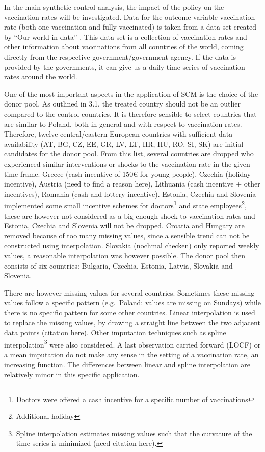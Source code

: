 \documentclass{scrbook}
\begin{document}
In the main synthetic control analysis, the impact of the policy on the
vaccination rates will be investigated. Data for the outcome variable
vaccination rate (both one vaccination and fully vaccinated) is taken
from a data set created by ``Our world in data''
\parencite{mathieu_global_2021}. This data set is a collection of
vaccination rates and other information about vaccinations from all
countries of the world, coming directly from the respective
government/government agency. If the data is provided by the
governments, it can give us a daily time-series of vaccination rates
around the world.

One of the most important aspects in the application of SCM is the
choice of the donor pool. As outlined in 3.1, the treated country should
not be an outlier compared to the control countries. It is therefore
sensible to select countries that are similar to Poland, both in general
and with respect to vaccination rates. Therefore, twelve central/eastern
European countries with sufficient data availability (AT, BG, CZ, EE,
GR, LV, LT, HR, HU, RO, SI, SK) are initial candidates for the donor
pool. From this list, several countries are dropped who experienced
similar interventions or shocks to the vaccination rate in the given
time frame. Greece (cash incentive of 150€ for young people), Czechia
(holiday incentive), Austria (need to find a reason here), Lithuania
(cash incentive + other incentives), Romania (cash and lottery
incentive). Estonia, Czechia and Slovenia implemented some small
incentive schemes for
doctors\footnote{Doctors were offered a cash incentive for a specific number of vaccinations}
and state employees\footnote{Additional holiday}, these are however not
considered as a big enough shock to vaccination rates and Estonia,
Czechia and Slovenia will not be dropped. Croatia and Hungary are
removed because of too many missing values, since a sensible trend can
not be constructed using interpolation. Slovakia (nochmal checken) only
reported weekly values, a reasonable interpolation was however possible.
The donor pool then consists of six countries: Bulgaria, Czechia,
Estonia, Latvia, Slovakia and Slovenia.

There are however missing values for several countries. Sometimes these
missing values follow a specific pattern (e.g.~Poland: values are
missing on Sundays) while there is no specific pattern for some other
countries. Linear interpolation is used to replace the missing values,
by drawing a straight line between the two adjacent data points
(citation here). Other imputation techniques such as spline
interpolation\footnote{Spline interpolation estimates missing values such that the curvature of the time series is minimized (need citation here).}
were also considered. A last observation carried forward (LOCF) or a
mean imputation do not make any sense in the setting of a vaccination
rate, an increasing function. The differences between linear and spline
interpolation are relatively minor in this specific application.
\end{document}
